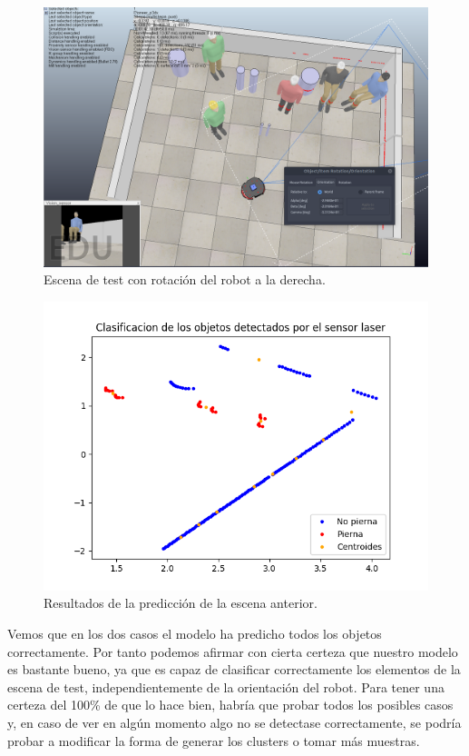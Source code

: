 \documentclass[11pt,a4paper]{article}
\begin{document}
\begin{figure}[H]
\centering
\includegraphics[scale=0.3]{img/simulador3}
\caption{Escena de test con rotación del robot a la derecha.}
\end{figure}

\begin{figure}[H]
\centering
\includegraphics[scale=0.6]{img/pred3}
\caption{Resultados de la predicción de la escena anterior.}
\label{fig:pred3}
\end{figure}

Vemos que en los dos casos el modelo ha predicho todos los objetos correctamente. Por tanto
podemos afirmar con cierta certeza que nuestro modelo es bastante bueno, ya que es capaz de
clasificar correctamente los elementos de la escena de test, independientemente de la orientación
del robot. Para tener una certeza del 100\% de que lo hace bien, habría que probar todos
los posibles casos y, en caso de ver en algún momento algo no se detectase correctamente,
se podría probar a modificar la forma de generar los clusters o tomar más muestras.
\end{document}
